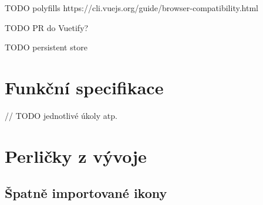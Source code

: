 TODO polyfills https://cli.vuejs.org/guide/browser-compatibility.html

TODO PR do Vuetify?

TODO persistent store


\section{Funkční specifikace}

// TODO jednotlivé úkoly atp.


\section{Perličky z vývoje}

\subsection{Špatně importované ikony}

